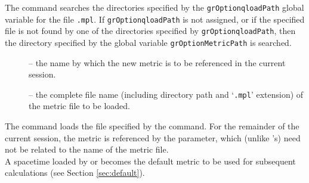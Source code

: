 \documentclass{article}
\begin{document}
The  command searches the directories specified by the
\texttt{grOptionqloadPath} global variable for the file
\texttt{.mpl}. If \texttt{grOptionqloadPath} is not
assigned, or if the specified file is not found by one of the directories
specified by \texttt{grOptionqloadPath}, then the directory specified
by the global variable \texttt{grOptionMetricPath} is searched.\\
%
\begin{cmdspec}
  \label{spec:grload}

  \begin{description}
    \item[] -- the name by which the new metric is to be
      referenced in the current session.
    \item[] -- the complete file name (including directory
      path and `\texttt{.mpl}' extension) of the metric file to be loaded.
  \end{description}

\end{cmdspec}

The  command loads the file specified by the 
command. For the remainder of the current session, the metric is referenced
by the  parameter, which (unlike 's) need not
be related to the name of the metric file.\\

A spacetime loaded by  or  becomes the default
metric to be used for subsequent calculations
(see Section \ref{sec:default}).\\
\end{document}
